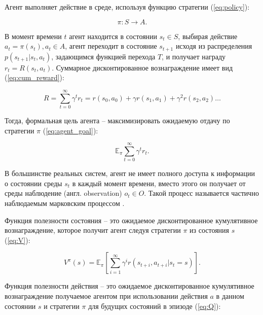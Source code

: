         Агент выполняет действие в среде, используя функцию стратегии (\ref{eq:policy}): 

        \begin{equation}
            \pi: S \to A.
            \label{eq:policy}
        \end{equation}

        В момент времени $t$ агент находится в состоянии $s_t \in S$, выбирая действие $a_t = \pi(s_t), a_t \in A$, агент переходит в состояние $s_{t + 1}$ исходя из распределения $p(s_{t + 1} | s_t, a_t)$, задающимся функцией перехода $T$, и получает награду $r_t = R(s_t, a_t)$. Суммарное дисконтированное вознаграждение имеет вид (\ref{eq:cum_reward}): 

        \begin{equation}
            R = \sum_{t = 0}^\infty  \gamma^t r_t = r(s_0, a_0) + \gamma r(s_1, a_1) + \gamma^2 r(s_2, a_2) \dots
            \label{eq:cum_reward}
        \end{equation}

        Тогда, формальная цель агента -- максимизировать ожидаемую отдачу по стратегии $\pi$ (\ref{eq:agent_goal}):

        \begin{equation}
            \mathbb{E}_{\pi} \sum_{t = 0}^\infty \gamma^t r_t.
            \label{eq:agent_goal}
        \end{equation}

        В большинстве реальных систем, агент не имеет полного доступа к информации о состоянии среды $s_t$ в каждый момент времени, вместо этого он получает от среды наблюдение (англ. observation) $o_t \in O$. Такой процесс называется частично наблюдаемым марковским процессом \cite{kaelbling1998planning}.

        Функция полезности состояния -- это ожидаемое дисконтированное кумулятивное вознаграждение, которое получит агент следуя стратегии $\pi$ из состояния $s$ (\ref{eq:V}):

        \begin{equation}
            V^{\pi} (s) = \mathbb{E}_{\pi} \left[ \sum_{i = 1}^{\infty} \gamma^i r(s_{t + i}, a_{t + i} | s_t = s) \right].
            \label{eq:V}
        \end{equation}

        Функция полезности действия -- это ожидаемое дисконтированное кумулятивное вознаграждение получаемое агентом при использовании действия $a$ в данном состоянии $s$ и стратегии $\pi$ для будущих состояний в эпизоде (\ref{eq:Q}):

